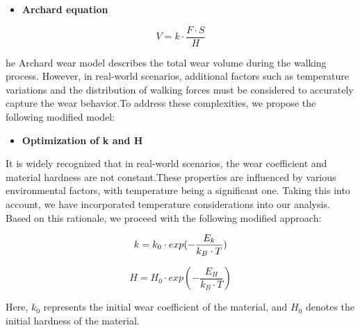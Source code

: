 \documentclass{mcmthesis}
\begin{document}




\begin{itemize}
\item {\bf Archard equation}
\end{itemize}

\begin{equation} %
\label{eq:1}
V = k \cdot \frac{F \cdot S}{H} 
\end{equation}

\noindent \hspace{1.5em}he Archard wear model describes the total wear volume during the walking process. However, in real-world scenarios, additional factors such as temperature variations and the distribution of walking forces must be considered to accurately capture the wear behavior.To address these complexities, we propose the following modified model:  

\begin{itemize}
\item {\bf Optimization of k and H}
\end{itemize}
\hspace{1.5em}It is widely recognized that in real-world scenarios, the wear coefficient and material hardness are not constant.These properties are influenced by various environmental factors, with temperature being a significant one. Taking this into account, we have incorporated temperature considerations into our analysis. Based on this rationale, we proceed with the following modified approach:

\begin{equation}
\label{eq:2}
\hfill k = k_0 \cdot exp{(-\frac{E_k}{k_B\cdot T})} \hfill
\end{equation}

\begin{equation}
H = H_0 \cdot exp{(-\frac{E_H}{k_B\cdot T})} \label{eq:3}
\end{equation}

Here, \(k_0\) represents the initial wear coefficient of the material, and \(H_0\) denotes the initial hardness of the material.
\end{document}
